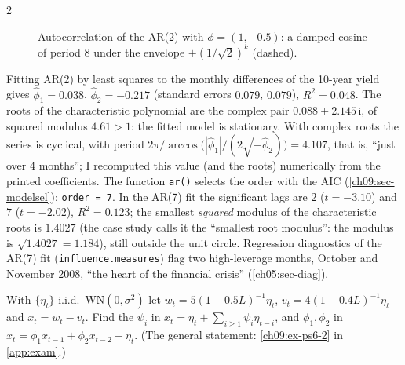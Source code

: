 \begin{paracol}{2}
\begin{figure}[ht]
\caption{Autocorrelation of the AR(2) with $\phi=(1,-0.5)$: a damped cosine of period $8$ under the
envelope $\pm(1/\sqrt2)^k$ (dashed).}\label{fig:ar2}
\end{figure}

\begin{casestudy}\label{ch09:cs-3b}
Fitting AR(2) by least squares to the monthly differences of the 10-year yield gives
$\hat\phi_1=0.038$, $\hat\phi_2=-0.217$ (standard errors $0.079$, $0.079$), $R^2=0.048$. The roots of the characteristic
polynomial are the complex pair $0.088\pm2.145\,\mathrm i$, of squared modulus $4.61>1$: the fitted model is
stationary. With complex roots the series is cyclical, with period
$2\pi/\arccos\bigl(|\hat\phi_1|/(2\sqrt{-\hat\phi_2})\bigr)=4.107$, that is, ``just over $4$ months''; I recomputed this value
(and the roots) numerically from the printed coefficients. The function \texttt{ar()} selects the order with the AIC
(\cref{ch09:sec-modelsel}): \texttt{order = 7}. In the AR(7) fit the significant lags are $2$ ($t=-3.10$) and $7$
($t=-2.02$), $R^2=0.123$; the smallest \emph{squared} modulus of the characteristic roots is $1.4027$ (the case study calls it
the ``smallest root modulus'': the modulus is $\sqrt{1.4027}=1.184$), still outside the unit circle. Regression diagnostics
of the AR(7) fit (\texttt{influence.measures}) flag two high-leverage months, October and November 2008, ``the heart of the
financial crisis'' (\cref{ch05:sec-diag}).
\end{casestudy}

\begin{exercise}\label{ch09:ex-ps6-2-short}
With $\{\eta_t\}$ i.i.d.\ $\mathrm{WN}(0,\sigma^2)$ let $w_t=5(1-0.5L)^{-1}\eta_t$, $v_t=4(1-0.4L)^{-1}\eta_t$ and $x_t=w_t-v_t$. Find the $\psi_i$ in $x_t=\eta_t+\sum_{i\ge1}\psi_i\eta_{t-i}$, and $\phi_1,\phi_2$ in $x_t=\phi_1x_{t-1}+\phi_2x_{t-2}+\eta_t$. (The general statement: \cref{ch09:ex-ps6-2} in \cref{app:exam}.)
\end{exercise}


\end{paracol}
